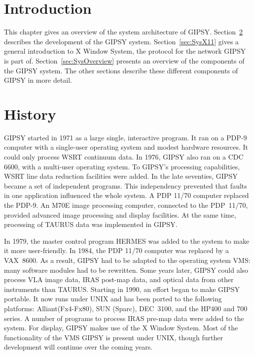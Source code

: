 \label{chapter:System}

\section{Introduction}

This chapter gives an overview of the system architecture of GIPSY. 
Section~\ref{sec:SysHistory} describes the development of the GIPSY
system.  Section~\ref{sec:SysX11} gives a general introduction to X
Window System, the protocol for the network GIPSY is part of. 
Section~\ref{sec:SysOverview} presents an overview of the components of
the GIPSY system.  The other sections describe these different
components of GIPSY in more detail. 

\section{History}
\label{sec:SysHistory}

GIPSY started in 1971 as a large single, interactive program.  It ran on
a PDP-9 computer with a single-user operating system and modest hardware
resources.  It could only process WSRT continuum data.  In 1976, GIPSY
also ran on a CDC 6600, with a multi-user operating system.  To GIPSY's
processing capabilities, WSRT line data reduction facilities were added. 
In the late seventies, GIPSY became a set of independent programs.  This
independency prevented that faults in one application influenced the
whole system.  A PDP 11/70 computer replaced the \mbox{PDP-9}.  An M70E
image processing computer, connected to the \mbox{PDP 11/70}, provided
advanced image processing and display facilities.  At the same time,
processing of TAURUS data was implemented in GIPSY.

In 1979, the master control program HERMES was added to the system to
make it more user-friendly.  In 1984, the PDP 11/70 computer was
replaced by a \mbox{VAX 8600.} As a result, GIPSY had to be adapted to
the operating system VMS: many software modules had to be rewritten. 
Some years later, GIPSY could also process VLA image data, IRAS post-map
data, and optical data from other instruments than TAURUS.  
Starting in 1990, an effort began to make GIPSY portable.  It now runs
under UNIX and has been ported to the following platforms:
Alliant(Fx4-Fx80), SUN (Sparc),  \mbox{DEC 3100,} and the HP400 and 700 series.
A number of programs to process IRAS pre-map data were
added to the system.  For display, GIPSY makes use of the X Window System. 
Most of the functionality of the VMS GIPSY is present under UNIX,
though further development will continue over the coming years.

